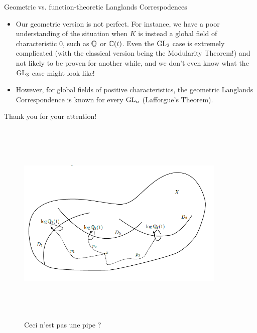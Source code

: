 \documentclass[professionalfonts]{beamer}
\begin{document}
    \begin{frame}{Geometric vs. function-theoretic Langlands Correspodences}
        \begin{itemize}
            \item Our geometric version is not perfect. For instance, we have a poor understanding of the situation when $K$ is instead a global field of characteristic $0$, such as $\mathbb{Q}$ or $\mathbb{C}(t)$. Even the $\operatorname{GL}_2$ case is extremely complicated (with the classical version being the Modularity Theorem!) and not likely to be proven for another while, and we don't even know what the $\operatorname{GL}_3$ case might look like!
            \item However, for global fields of positive characteristics, the geometric Langlands Correspondence is known for every $\operatorname{GL}_n$ (Lafforgue's Theorem).
        \end{itemize}
    \end{frame}
    
    \begin{frame}{Thank you for your attention!}
        \begin{figure}[H]
            \centering
            \includegraphics[width=10cm,height=10cm,keepaspectratio]{Proposal, timeline, and presentation/weight2cut.png}
            \caption{Ceci n'est pas une pipe ?}
            \label{fig: arithmetic_naan}
        \end{figure}
    \end{frame}
\end{document}
